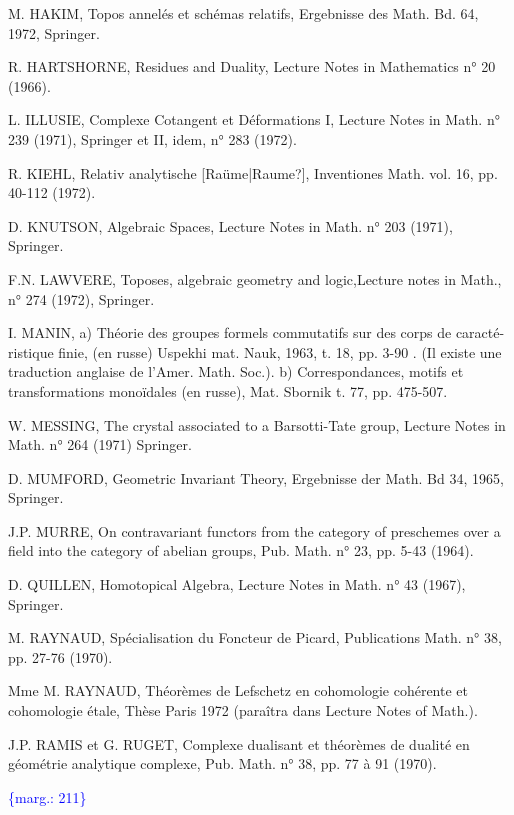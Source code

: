 \documentclass[11pt]{article}
\newcommand{\scanpage}[1]{\par\bigskip\noindent{\small\sffamily[scan #1]}\par}
\newcommand{\mspage}[1]{{\small\sffamily[p.\,#1]}}
\newcommand{\margin}[1]{\textcolor{blue}{\{\textsf{marg.:} #1\}}}
\newcommand{\unsure}[1]{[#1?]}
\begin{document}
M. HAKIM, Topos annelés et schémas relatifs, Ergebnisse des Math. Bd. 64, 1972,
Springer.

R. HARTSHORNE, Residues and Duality, Lecture Notes in Mathematics n° 20 (1966).

L. ILLUSIE, Complexe Cotangent et Déformations I, Lecture Notes in Math. n° 239
(1971), Springer et II, idem, n° 283 (1972).

R. KIEHL, Relativ analytische \unsure{Raüme|Raume}, Inventiones Math. vol. 16, pp. 40-112
(1972).

D. KNUTSON, Algebraic Spaces, Lecture Notes in Math. n° 203 (1971), Springer.

F.N. LAWVERE, Toposes, algebraic geometry and logic,Lecture notes in Math.,
n° 274 (1972), Springer.

I. MANIN, a) Théorie des groupes formels commutatifs sur des corps de caracté-%
ristique finie, (en russe) Uspekhi mat. Nauk, 1963, t. 18,
pp. 3-90 . (Il existe une traduction anglaise de  l'Amer. Math. Soc.).
b) Correspondances, motifs et transformations monoïdales (en russe),
Mat. Sbornik t. 77, pp. 475-507.

W. MESSING, The crystal associated to a Barsotti-Tate group, Lecture Notes in
Math. n° 264 (1971) Springer.

D. MUMFORD, Geometric Invariant Theory, Ergebnisse der Math. Bd 34, 1965,
Springer.

J.P. MURRE, On contravariant functors from the category of preschemes over a
field into the category of abelian groups, Pub. Math. n° 23,
pp. 5-43 (1964).

D. QUILLEN, Homotopical Algebra, Lecture Notes in Math. n° 43 (1967), Springer.

M. RAYNAUD, Spécialisation du Foncteur de Picard, Publications Math. n° 38,
pp. 27-76 (1970).

Mme M. RAYNAUD, Théorèmes de Lefschetz en cohomologie cohérente et cohomologie
étale, Thèse Paris 1972 (paraîtra dans Lecture Notes of Math.).

J.P. RAMIS et G. RUGET, Complexe dualisant et théorèmes de dualité en géométrie
analytique complexe, Pub. Math. n° 38, pp. 77 à 91 (1970).

\margin{211}

\clearpage
\scanpage{119/212}
\mspage{- 17 -}
\end{document}
